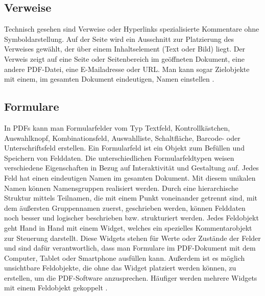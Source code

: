 \subsection{Verweise}
Technisch gesehen sind Verweise oder Hyperlinks spezialisierte Kommentare ohne Symboldarstellung. Auf der Seite wird ein Ausschnitt zur Platzierung des Verweises gewählt, der über einem Inhaltselement (Text oder Bild) liegt. Der Verweis zeigt auf eine Seite oder Seitenbereich im geöffneten Dokument, eine andere PDF-Datei, eine E-Mailadresse oder URL. Man kann sogar Zielobjekte mit einem, im gesamten Dokument eindeutigen, Namen einstellen \cite{softx}. 

\subsection{Formulare}
In PDFs kann man Formularfelder vom Typ Textfeld, Kontrollkästchen, Auswahlknopf, Kombinationsfeld, Auswahlliste, Schaltfläche, Barcode- oder Unterschriftsfeld erstellen. Ein Formularfeld ist ein Objekt zum Befüllen und Speichern von Felddaten. Die unterschiedlichen Formularfeldtypen weisen verschiedene Eigenschaften in Bezug auf Interaktivität und Gestaltung auf. Jedes Feld hat einen eindeutigen Namen im gesamten Dokument. Mit diesem unikalen Namen können Namensgruppen realisiert werden. Durch eine hierarchische Struktur mittels Teilnamen, die mit einem Punkt voneinander getrennt sind, mit dem äußersten Gruppennamen zuerst, geschrieben werden, können Felddaten noch besser und logischer beschrieben bzw. strukturiert werden. Jedes Feldobjekt geht Hand in Hand mit einem Widget, welches ein spezielles Kommentarobjekt zur Steuerung darstellt. Diese Widgets stehen für Werte oder Zustände der Felder und sind dafür verantwortlich, dass man Formulare im PDF-Dokument mit dem Computer, Tablet oder Smartphone ausfüllen kann. Außerdem ist es möglich unsichtbare Feldobjekte, die ohne das Widget platziert werden können, zu erstellen, um die PDF-Software anzusprechen. Häufiger werden mehrere Widgets mit einem Feldobjekt gekoppelt \cite{softx}. \\
